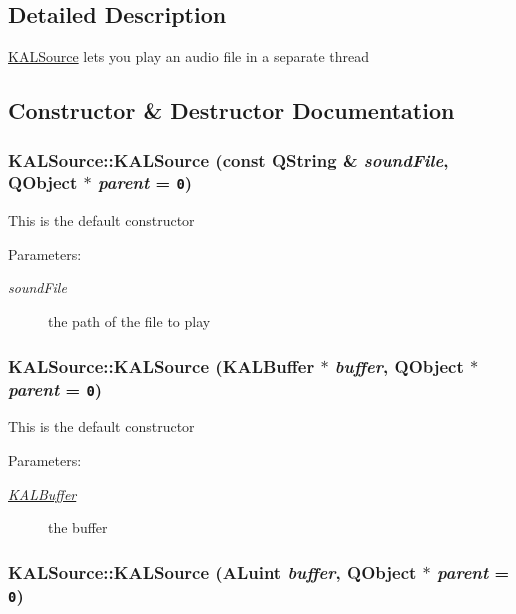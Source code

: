 \subsection{Detailed Description}
\hyperlink{class_k_a_l_source}{KALSource} lets you play an audio file in a separate thread 

\subsection{Constructor \& Destructor Documentation}
\hypertarget{class_k_a_l_source_b3b40eec42acf80fd6e4448eb3632215}{
\subsubsection[{KALSource}]{\setlength{\rightskip}{0pt plus 5cm}KALSource::KALSource (const QString \& {\em soundFile}, \/  QObject $\ast$ {\em parent} = {\tt 0})}}
\label{class_k_a_l_source_b3b40eec42acf80fd6e4448eb3632215}


This is the default constructor \begin{Desc}
\item[Parameters:]
\begin{description}
\item[{\em soundFile}]the path of the file to play \end{description}
\end{Desc}
\hypertarget{class_k_a_l_source_db8a19fc41825ed536eb8d5235fcfff0}{
\subsubsection[{KALSource}]{\setlength{\rightskip}{0pt plus 5cm}KALSource::KALSource ({\bf KALBuffer} $\ast$ {\em buffer}, \/  QObject $\ast$ {\em parent} = {\tt 0})}}
\label{class_k_a_l_source_db8a19fc41825ed536eb8d5235fcfff0}


This is the default constructor \begin{Desc}
\item[Parameters:]
\begin{description}
\item[{\em \hyperlink{class_k_a_l_buffer}{KALBuffer}}]the buffer \end{description}
\end{Desc}
\hypertarget{class_k_a_l_source_5daddf666e7bf2ecda0a29baa8db8f7c}{
\subsubsection[{KALSource}]{\setlength{\rightskip}{0pt plus 5cm}KALSource::KALSource (ALuint {\em buffer}, \/  QObject $\ast$ {\em parent} = {\tt 0})}}
\label{class_k_a_l_source_5daddf666e7bf2ecda0a29baa8db8f7c}


